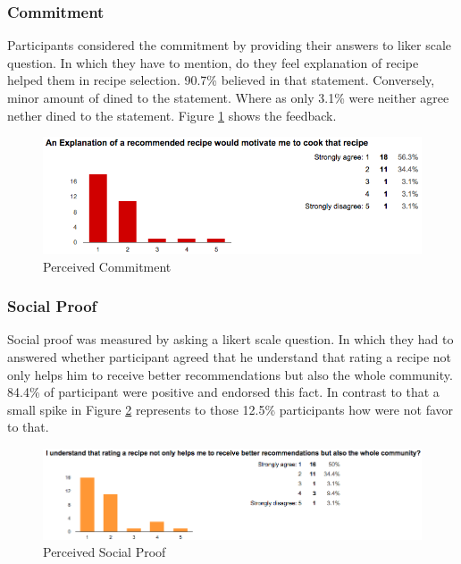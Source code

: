 \subsubsection{Commitment}
Participants considered the commitment by providing their answers to liker scale question. In which they have to mention, do they feel explanation of recipe helped them in recipe selection. 90.7\% believed in that statement. Conversely, minor amount of dined to the statement. Where as only 3.1\% were neither agree nether dined to the statement. Figure \ref{fig:ch5_commitment} shows the feedback.
\begin{figure}[h]
	\centering
	\includegraphics[width=1\linewidth]{figures/ch5_stat_commitment}
	\caption{Perceived Commitment}
	\label{fig:ch5_commitment}
\end{figure}
\subsubsection{Social Proof}
Social proof was measured by asking a likert scale question. In which they had to answered whether participant agreed that he understand that rating a recipe not only helps him to receive better recommendations but also the whole community. 84.4\% of participant were positive and endorsed this fact. In contrast to that a small spike in Figure \ref{fig:ch5_stat_social_proof} represents to those 12.5\% participants how were not favor to that. 
\begin{figure}[h]
\centering
\includegraphics[width=1\linewidth]{figures/ch5_stat_social_proof.png}
\caption{Perceived Social Proof}
\label{fig:ch5_stat_social_proof}
\end{figure}
